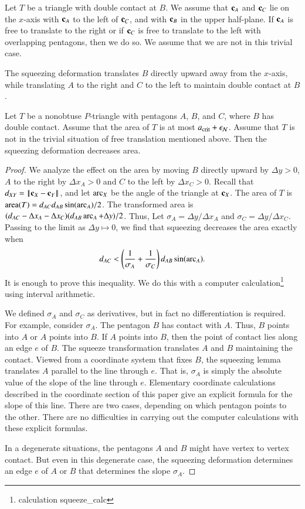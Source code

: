 Let $T$ be a triangle with double contact at $B$.  We assume that
${\mathbf c}_A$ and ${\mathbf c}_C$ lie on the $x$-axis with ${\mathbf c}_A$ to the left of
${\mathbf c}_C$, and with ${\mathbf c}_B$ in the upper half-plane.  If ${\mathbf c}_A$ is free to
translate to the right or if ${\mathbf c}_C$ is free to translate to the left
with overlapping pentagons, then we do so.  We assume that we are not
in this trivial case.

The squeezing deformation translates $B$ directly upward away from the
$x$-axis, while translating $A$ to the right and $C$ to the left to
maintain double contact at $B$.

\begin{lemma}  
  Let $T$ be a nonobtuse $P$-triangle with pentagons $A$, $B$, and
  $C$, where $B$ has double contact.  Assume that the area of $T$ is
  at most $a_\text{crit}+\epsilon_{\mathcal N}$.  Assume that $T$ is not in the trivial
  situation of free translation mentioned above.  Then the squeezing
  deformation decreases area.
\end{lemma}

\begin{proof}  
  We analyze the effect on the area by moving $B$ directly upward by
  $\Delta y >0$, $A$ to the right by $\Delta x_A >0$ and $C$ to the
  left by $\Delta x_C >0$.  Recall that $\dx{XY} = \dd{X}{Y}$, and let
  $\operatorname{arc}_X$ be the angle of the triangle at ${\mathbf c}_X$.  The area of $T$ is
  ${\operatorname{area}}(T) = d_{AC} d_{AB} \sin(\operatorname{arc}_A)/2$.  The transformed area is
  $(d_{AC}-\Delta x_A - \Delta x_C)(d_{AB}\operatorname{arc}_A + \Delta y)/2$.
  Thus, Let $\sigma_A = \Delta y/\Delta x_A$ and $\sigma_C = \Delta y
  /\Delta x_C$.  Passing to the limit as $\Delta y \mapsto 0$, we find
  that squeezing decreases the area exactly when
\[
d_{AC} < \left(\frac{1}{\sigma_A}
+\frac{1}{\sigma_C}\right)d_{AB}\sin(\operatorname{arc}_A).
\]
It is enough to prove this inequality.  We do this with a computer
calculation\footnote{calculation squeeze\_calc} using interval
arithmetic.

We defined $\sigma_A$ and $\sigma_C$ as derivatives, but in fact no
differentiation is required.  For example, consider $\sigma_A$.  The
pentagon $B$ has contact with $A$.  Thus, $B$ points into $A$ or $A$
points into $B$.  If $A$ points into $B$, then the point of contact
lies along an edge $e$ of $B$.  The squeeze transformation translates
$A$ and $B$ maintaining the contact.  Viewed from a coordinate system
that fixes $B$, the squeezing lemma translates $A$ parallel to the
line through $e$.  That is, $\sigma_A$ is simply the absolute value of
the slope of the line through $e$.  Elementary coordinate calculations
described in the coordinate section of this paper give an explicit
formula for the slope of this line.  There are two cases, depending on
which pentagon points to the other.  There are no difficulties in
carrying out the computer calculations with these explicit formulas.

In a degenerate situations, the pentagons $A$ and $B$ might have
vertex to vertex contact. But even in this degenerate case, the
squeezing deformation determines an edge $e$ of $A$ or $B$ that
determines the slope $\sigma_A$.
\end{proof}

